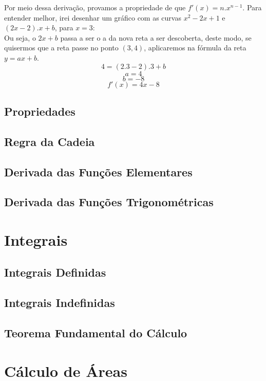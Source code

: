 \documentclass[ ]{article}
\begin{document}
	Por meio dessa derivação, provamos a propriedade de que $f'(x) = n.x^{n-1}$.
	\newpage
	Para entender melhor, irei desenhar um gráfico com as curvas $x^2-2x+1$ e $(2x-2).x+b$, para $x=3$:\\
	Ou seja, o $2x+b$ passa a ser o a da nova reta a ser descoberta, deste modo, se quisermos que a reta passe no ponto $(3,4)$, aplicaremos na fórmula da reta $y = ax+b$.
	$$4 = (2.3-2).3 + b$$
	$$a = 4$$ $$b=-8$$
	$$f'(x) = 4x - 8$$
	
	
	\subsection{Propriedades}
	
	\subsection{Regra da Cadeia}
	\subsection{Derivada das Funções Elementares}
	\subsection{Derivada das Funções Trigonométricas}
\section{Integrais}
	\subsection{Integrais Definidas}
	\subsection{Integrais Indefinidas}
	\subsection{Teorema Fundamental do Cálculo}
\section{Cálculo de Áreas}
	
\end{document}
